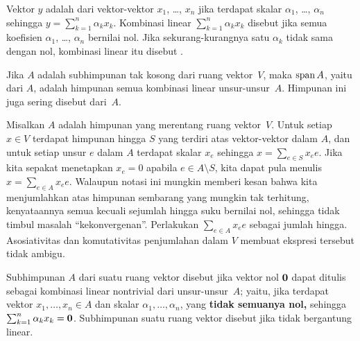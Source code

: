 \begin{defn} Vektor $y$ adalah
 dari vektor-vektor $x_1$, \dots, $x_n$ jika terdapat skalar $\alpha_1$,
\dots, $\alpha_n$ sehingga $y = \sum_{k=1}^n \alpha_k x_k$. Kombinasi linear $\sum_{k=1}^n \alpha_k x_k$ disebut
 jika semua koefisien $\alpha_1$, \dots, $\alpha_n$ bernilai nol. Jika sekurang-kurangnya
satu $\alpha_k$ tidak sama dengan nol, kombinasi linear itu disebut .
\end{defn}

\begin{defn} Jika $A$ adalah subhimpunan tak kosong dari ruang vektor~$V$, maka $\operatorname{span} A$, yaitu
 dari $A$, adalah himpunan semua kombinasi linear unsur-unsur~$A$. Himpunan ini juga sering disebut
 dari~$A$.
\end{defn}

\begin{notn}\label{bases111} Misalkan $A$ adalah himpunan yang merentang ruang vektor~$V$. Untuk setiap
$x \in V$ terdapat himpunan hingga $S$ yang terdiri atas vektor-vektor dalam $A$, dan untuk setiap unsur $e$ dalam $A$
terdapat skalar $x_e$ sehingga $x = \sum_{e \in S} x_e e$. Jika kita sepakat menetapkan $x_e = 0$
apabila $e \in A \setminus S$, kita dapat pula menulis $x = \sum_{e \in A} x_e e$. Walaupun
notasi ini mungkin memberi kesan bahwa kita menjumlahkan atas himpunan sembarang yang mungkin tak terhitung,
kenyataannya semua kecuali sejumlah hingga suku bernilai nol, sehingga tidak timbul masalah
``kekonvergenan''. Perlakukan $\sum_{e \in A} x_e e$ sebagai jumlah hingga.
Asosiativitas dan komutativitas penjumlahan dalam $V$ membuat ekspresi tersebut tidak ambigu.
\end{notn}

\begin{defn}\label{defn_lin_dep} Subhimpunan $A$ dari suatu ruang vektor disebut
 jika vektor nol $\mathbf{0}$ dapat ditulis sebagai kombinasi linear nontrivial
dari unsur-unsur~$A$; yaitu, jika terdapat vektor $x_1, \dots, x_n \in A$
dan skalar $\alpha_1, \dots, \alpha_n$, yang \textbf{tidak semuanya nol,} sehingga $\sum_{k=1}^n
\alpha_kx_k = \mathbf{0}$. Subhimpunan suatu ruang vektor disebut
 jika tidak bergantung linear.
\end{defn}

